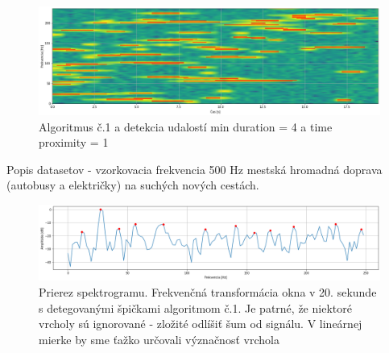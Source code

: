 \begin{figure}[h]
   \centering
    \includegraphics[width=\textwidth]{figures/verification/Sythetic-A1-events.png}
   \caption{Algoritmus č.1 a detekcia udalostí min duration = 4 a time proximity = 1}
\end{figure}


Popis datasetov - vzorkovacia frekvencia 500 Hz mestská hromadná doprava (autobusy a električky) na suchých nových cestách.

\begin{figure}[h]
   \centering
    \includegraphics[width=\textwidth]{figures/verification/L83-slice-t-20-A1.png}
   \caption{Prierez spektrogramu. Frekvenčná transformácia okna v 20. sekunde s detegovanými špičkami algoritmom č.1. Je patrné, že
   niektoré vrcholy sú ignorované - zložité odlíšiť šum od signálu. V lineárnej mierke by sme ťažko určovali význačnosť vrchola}
\end{figure}


